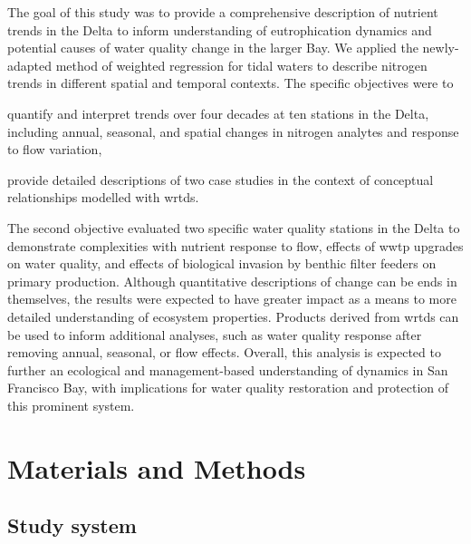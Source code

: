 \documentclass[journal = esthag, manuscript = article]{achemso}\usepackage[]{graphicx}\usepackage[]{color}
\begin{document}
The goal of this study was to provide a comprehensive description of nutrient trends in the Delta to inform understanding of eutrophication dynamics and potential causes of water quality change in the larger Bay. We applied the newly-adapted method of weighted regression for tidal waters to describe nitrogen trends in  different spatial and temporal contexts. The specific objectives were to \begin{inparaenum}[1\upshape)]  
\item quantify and interpret trends over four decades at ten stations in the Delta, including annual, seasonal, and spatial changes in nitrogen analytes and response to flow variation,
\item provide detailed descriptions of two case studies in the context of conceptual relationships modelled with \ac{wrtds}.
\end{inparaenum}
The second objective evaluated two specific water quality stations in the Delta to demonstrate complexities with nutrient response to flow, effects of \ac{wwtp} upgrades on water quality, and effects of biological invasion by benthic filter feeders on primary production. Although quantitative descriptions of change can be ends in themselves, the results were expected to have greater impact as a means to more detailed understanding of ecosystem properties.  Products derived from \ac{wrtds} can be used to inform additional analyses, such as water quality response after removing annual, seasonal, or flow effects. Overall, this analysis is expected to further an ecological and management-based understanding of dynamics in San Francisco Bay, with implications for water quality restoration and protection of this prominent system. 

\section{Materials and Methods}

\subsection{Study system}
\end{document}
